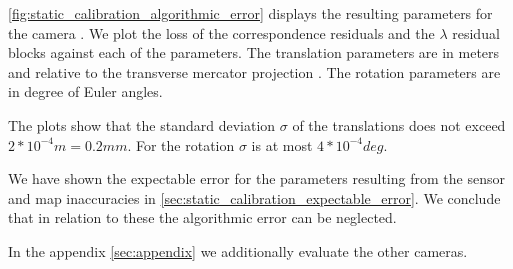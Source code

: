\autoref{fig:static_calibration_algorithmic_error} displays the resulting parameters for the camera .
We plot the loss of the correspondence residuals and the $\lambda$ residual blocks against each of the parameters.
The translation parameters are in meters and relative to the transverse mercator projection \cite{lambert1894anmerkungen}.
The rotation parameters are in degree of Euler angles.

The plots show that the standard deviation $\sigma$ of the translations does not exceed $2 * 10^{-4} m = 0.2 mm$.
For the rotation $\sigma$ is at most $4 * 10^{-4} deg$. 

We have shown the expectable error for the parameters resulting from the sensor and map inaccuracies in \autoref{sec:static_calibration_expectable_error}. 
We conclude that in relation to these the algorithmic error can be neglected.

In the appendix \autoref{sec:appendix} we additionally evaluate the other cameras.

